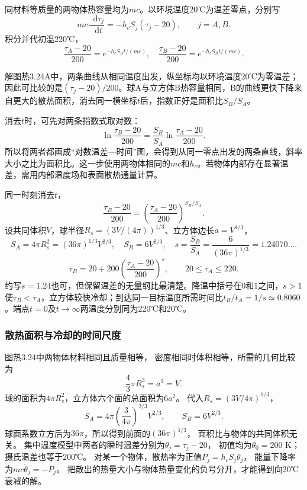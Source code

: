 \documentclass[UTF8,fontset=fandol,a4paper,11pt]{ctexart}
\newcommand{\dd}{\mathop{}\!\mathrm{d}}
\newcommand{\result}[1]{\begin{equation*}\boxed{#1}\end{equation*}}
\newcommand{\figcaption}[1]{\par\vspace{2pt}{\small\color{muted}#1}\par}
\begin{document}
同材料等质量的两物体热容量均为$mc$。以环境温度20℃为温差零点，分别写
\[mc\frac{\dd\tau_j}{\dd t}=-h_cS_j(\tau_j-20),\qquad j=A,B.\]
积分并代初温220℃，
\[\frac{\tau_A-20}{200}=e^{-h_cS_At/(mc)},\quad
\frac{\tau_B-20}{200}=e^{-h_cS_Bt/(mc)}.\]
\begin{center}\begin{minipage}{0.96\linewidth}\centering{}\figcaption{解图 热3.24A　B表面积较大，温差随同一时间更快衰减。}\end{minipage}\end{center}
解图热3.24A中，两条曲线从相同温度出发，纵坐标均以环境温度20℃为零温差；因此可比较的是$(\tau_j-20)/200$。球A与立方体B热容量相同，B的曲线更快下降来自更大的散热面积，消去同一横坐标$t$后，指数正好是面积比$S_B/S_A$。

消去$t$时，可先对两条指数式取对数：
\[\ln\frac{\tau_B-20}{200}
=\frac{S_B}{S_A}\ln\frac{\tau_A-20}{200}.\]
所以将两者都画成“对数温差—时间”图，会得到从同一零点出发的两条直线，斜率大小之比为面积比。这一步使用两物体相同的$mc$和$h_c$。若物体内部存在显著温差，需用内部温度场和表面散热通量计算。

同一时刻消去$t$，
\[\frac{\tau_B-20}{200}=\left(\frac{\tau_A-20}{200}\right)^{S_B/S_A}.\]
设共同体积$V$，球半径$R_s=(3V/(4\pi))^{1/3}$、立方体边长$a=V^{1/3}$，
\[S_A=4\pi R_s^2=(36\pi)^{1/3}V^{2/3},\quad
S_B=6V^{2/3},\quad s=\frac{S_B}{S_A}=\frac6{(36\pi)^{1/3}}=1.24070\ldots.\]
\result{\tau_B=20+200\left(\frac{\tau_A-20}{200}\right)^{s},\qquad20\le\tau_A\le220.}
约写$s=1.24$也可，但保留温差的无量纲比最清楚。降温中括号在0和1之间，$s>1$使$\tau_B<\tau_A$，立方体较快冷却；到达同一目标温度所需时间比$t_B/t_A=1/s\simeq0.8060$。端点$t=0$及$t\to\infty$两温度分别同为220℃和20℃。
\subsubsection*{散热面积与冷却的时间尺度}
图热3.24中两物体材料相同且质量相等，
密度相同时体积相等，所需的几何比较为
\[
\frac43\pi R_s^3=a^3=V.
\]
球的面积为$4\pi R_s^2$，立方体六个面的总面积为$6a^2$。
代入$R_s=(3V/4\pi)^{1/3}$，
\[
S_A=4\pi\left(\frac3{4\pi}\right)^{2/3}V^{2/3},
\qquad S_B=6V^{2/3}.
\]
球面系数立方后为$36\pi$，所以得到前面的$(36\pi)^{1/3}$，
面积比与物体的共同体积无关。
集中温度模型中两者的瞬时温差分别为$\theta_j=\tau_j-20$，
初值均为$\theta_0=200$ K；摄氏温差也等于200℃。
对某一个物体，散热率为正值$P_j=h_cS_j\theta_j$，
能量下降率为$mc\dot\theta_j=-P_j$。
把散出的热量大小与物体热量变化的负号分开，才能得到向20℃衰减的解。
\end{document}
